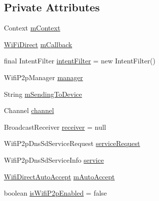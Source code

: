 \subsection*{Private Attributes}
\begin{DoxyCompactItemize}
\item 
Context \hyperlink{classcom_1_1copelabs_1_1oiframework_1_1wifi_1_1_wi_fi_direct_utils_a7eb74c5567159ba6d78c824d290c07bb}{m\+Context}
\item 
\hyperlink{classcom_1_1copelabs_1_1oiframework_1_1wifi_1_1_wi_fi_direct}{Wi\+Fi\+Direct} \hyperlink{classcom_1_1copelabs_1_1oiframework_1_1wifi_1_1_wi_fi_direct_utils_af418801f7c19d45da15758d1bc249bff}{m\+Callback}
\item 
final Intent\+Filter \hyperlink{classcom_1_1copelabs_1_1oiframework_1_1wifi_1_1_wi_fi_direct_utils_ad54d0959e6ba60f5fb710d3ec290e2f0}{intent\+Filter} = new Intent\+Filter()
\item 
Wifi\+P2p\+Manager \hyperlink{classcom_1_1copelabs_1_1oiframework_1_1wifi_1_1_wi_fi_direct_utils_afb6875dd96f0909299655f9e6f891b95}{manager}
\item 
String \hyperlink{classcom_1_1copelabs_1_1oiframework_1_1wifi_1_1_wi_fi_direct_utils_adf06201fee5e3db7065aca769ed40611}{m\+Sending\+To\+Device}
\item 
Channel \hyperlink{classcom_1_1copelabs_1_1oiframework_1_1wifi_1_1_wi_fi_direct_utils_a3db03ac16fb1d24d230652cf57a2de63}{channel}
\item 
Broadcast\+Receiver \hyperlink{classcom_1_1copelabs_1_1oiframework_1_1wifi_1_1_wi_fi_direct_utils_af84082b2217bab2675e5df9c19c9d8f8}{receiver} = null
\item 
Wifi\+P2p\+Dns\+Sd\+Service\+Request \hyperlink{classcom_1_1copelabs_1_1oiframework_1_1wifi_1_1_wi_fi_direct_utils_a7f5c38cf0095c50c24a931ae4c20588d}{service\+Request}
\item 
Wifi\+P2p\+Dns\+Sd\+Service\+Info \hyperlink{classcom_1_1copelabs_1_1oiframework_1_1wifi_1_1_wi_fi_direct_utils_adcf129bd2575419f4af7f1b08c7f0c51}{service}
\item 
\hyperlink{classcom_1_1copelabs_1_1oiframework_1_1wifi_1_1_wifi_direct_auto_accept}{Wifi\+Direct\+Auto\+Accept} \hyperlink{classcom_1_1copelabs_1_1oiframework_1_1wifi_1_1_wi_fi_direct_utils_a55509d0727e121f1618aebc093933583}{m\+Auto\+Accept}
\item 
boolean \hyperlink{classcom_1_1copelabs_1_1oiframework_1_1wifi_1_1_wi_fi_direct_utils_a77f5909127d477f0630858fe4f68df46}{is\+Wifi\+P2p\+Enabled} = false
\item 

\end{DoxyCompactItemize}
